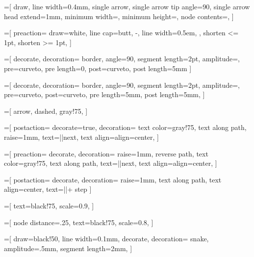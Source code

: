 

\newlength{\bigarrowwidth}
\setlength{\bigarrowwidth}{5mm}
=[
  draw,
  line width=0.4mm,
  single arrow,
  single arrow tip angle=90,
  single arrow head extend=1mm,
  minimum width=\bigarrowwidth,
  minimum height=\bigarrowwidth,
  node contents={},
]

=[
  preaction={
    draw=white,
    line cap=butt,
    -,
    line width=0.5em,
  },
  shorten <= 1pt,
  shorten >= 1pt,
]

=[
  decorate,
  decoration={
    border,
    angle=90,
    segment length=2pt,
    amplitude=\pgflinewidth,
    pre=curveto,
    pre length=0,
    post=curveto,
    post length=5mm
  }
]

=[
  decorate,
  decoration={
    border,
    angle=90,
    segment length=2pt,
    amplitude=\pgflinewidth,
    pre=curveto,
    post=curveto,
    pre length=5mm,
    post length=5mm,
  }
]

=[
  arrow,
  dashed,
  gray!75,
]

=[
  postaction={
    decorate=true,
    decoration={
      text color=gray!75,
      text along path,
      raise=1mm,
      text={|\ttfamily\scriptsize|next},
      text align={align=center},
    }
  }
]

=[
  preaction={
    decorate,
    decoration={
      raise=1mm,
      reverse path,
      text color=gray!75,
      text along path,
      text={|\ttfamily\scriptsize|next},
      text align={align=center},
    }
  }
]

=[
  postaction={
    decorate,
    decoration={
      raise=1mm,
      text along path,
      text align=center,
      text={|\ttfamily \scriptsize|+ step}
    }
  }
]

=[
  text=black!75,
  scale=0.9,
]

=[
  node distance=.25,
  text=black!75,
  scale=0.8,
]

=[
  draw=black!50,
  line width=0.1mm,
  decorate,
  decoration={
    snake,
    amplitude=.5mm,
    segment length=2mm,
  }
]

